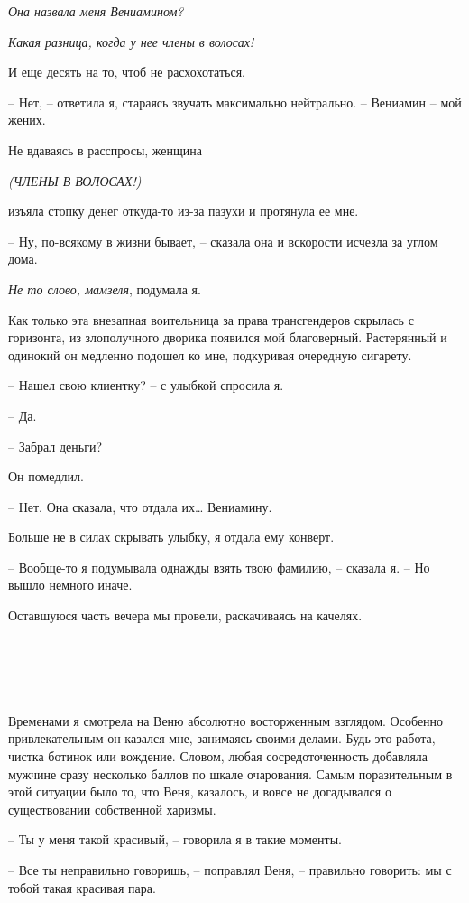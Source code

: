 \documentclass[
]{book}
\begin{document}
\emph{Она назвала меня Вениамином?}

\emph{Какая разница, когда у нее члены в волосах!}

И еще десять на то, чтоб не расхохотаться.

-- Нет, -- ответила я, стараясь звучать максимально нейтрально. -- Вениамин -- мой жених.

Не вдаваясь в расспросы, женщина

\emph{(ЧЛЕНЫ В ВОЛОСАХ!)}

изъяла стопку денег откуда-то из-за пазухи и протянула ее мне.

-- Ну, по-всякому в жизни бывает, -- сказала она и вскорости исчезла за углом дома.

\emph{Не то слово, мамзеля}, подумала я.

Как только эта внезапная воительница за права трансгендеров скрылась с горизонта, из злополучного дворика появился мой благоверный. Растерянный и одинокий он медленно подошел ко мне, подкуривая очередную сигарету.

-- Нашел свою клиентку? -- с улыбкой спросила я.

-- Да.

-- Забрал деньги?

Он помедлил.

-- Нет. Она сказала, что отдала их\ldots{} Вениамину.

Больше не в силах скрывать улыбку, я отдала ему конверт.

-- Вообще-то я подумывала однажды взять твою фамилию, -- сказала я. -- Но вышло немного иначе.

Оставшуюся часть вечера мы провели, раскачиваясь на качелях.

\hypertarget{chapter-21}{%
\chapter{~}\label{chapter-21}}

Временами я смотрела на Веню абсолютно восторженным взглядом. Особенно привлекательным он казался мне, занимаясь своими делами. Будь это работа, чистка ботинок или вождение. Словом, любая сосредоточенность добавляла мужчине сразу несколько баллов по шкале очарования. Самым поразительным в этой ситуации было то, что Веня, казалось, и вовсе не догадывался о существовании собственной харизмы.

-- Ты у меня такой красивый, -- говорила я в такие моменты.

-- Все ты неправильно говоришь, -- поправлял Веня, -- правильно говорить: мы с тобой такая красивая пара.
\end{document}
